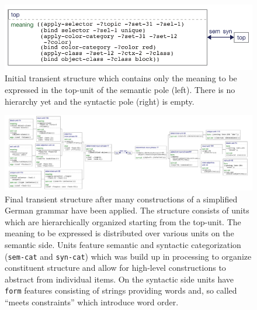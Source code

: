 \begin{figure}
\begin{center}
\includegraphics[width=.8\textwidth]{figs/simple-grammar-initial}
\end{center}
\caption[Initial transient structure]{Initial transient structure which 
contains only the meaning 
to be expressed in the top-unit of the semantic pole (left).
There is no hierarchy yet and the syntactic pole (right) is empty.}
\label{f:initial-structure}
\end{figure}

\begin{figure}
\begin{center}
\includegraphics[width=\textwidth]{figs/simple-grammar-final}
\end{center}
\caption[Final transient structure]{Final transient structure after 
many constructions of a simplified German grammar have been applied.
The structure consists of units which are hierarchically organized starting
from the top-unit. The meaning to be expressed is distributed over various 
units on the semantic side. Units feature 
semantic and syntactic categorization ({\footnotesize\tt sem-cat} and {\footnotesize\tt syn-cat})
which was build up in processing to organize constituent structure and
allow for high-level constructions to abstract from individual items.
On the syntactic side units have {\footnotesize\tt form} features consisting
of strings providing words and, so called ``meets constraints'' which introduce 
word order.}
\label{f:final-structure}
\end{figure}

